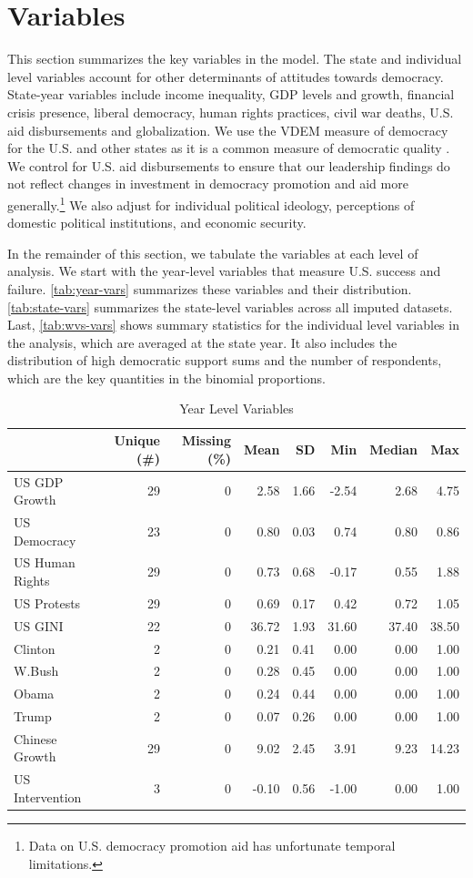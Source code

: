 \documentclass[12pt]{article}
\begin{document}
\section{Variables}


This section summarizes the key variables in the model. 
The state and individual level variables account for other determinants of attitudes towards democracy. 
State-year variables include income inequality, GDP levels and growth, financial crisis presence, liberal democracy, human rights practices, civil war deaths, U.S. aid disbursements and globalization. 
We use the VDEM measure of democracy for the U.S. and other states as it is a common measure of democratic quality \citep{WaldnerLust2018}.
We control for U.S. aid disbursements to ensure that our leadership findings do not reflect changes in investment in democracy promotion and aid more generally.\footnote{Data on U.S. democracy promotion aid has unfortunate temporal limitations.} 
We also adjust for individual political ideology, perceptions of domestic political institutions, and economic security.


In the remainder of this section, we tabulate the variables at each level of analysis. 
We start with the year-level variables that measure U.S. success and failure. 
\autoref{tab:year-vars} summarizes these variables and their distribution. 
\autoref{tab:state-vars} summarizes the state-level variables across all imputed datasets.
Last, \autoref{tab:wvs-vars} shows summary statistics for the individual level variables in the analysis, which are averaged at the state year. 
It also includes the distribution of high democratic support sums and the number of respondents, which are the key quantities in the binomial proportions.
 
 
\begin{table}
\caption{\label{tab:year-vars}Year Level Variables}
\centering
\begin{tabular}[t]{lrrrrrrr}
\toprule
  & Unique (\#) & Missing (\%) & Mean & SD & Min & Median & Max\\
\midrule
US GDP Growth & 29 & 0 & 2.58 & 1.66 & -2.54 & 2.68 & 4.75\\
US Democracy & 23 & 0 & 0.80 & 0.03 & 0.74 & 0.80 & 0.86\\
US Human Rights & 29 & 0 & 0.73 & 0.68 & -0.17 & 0.55 & 1.88\\
US Protests & 29 & 0 & 0.69 & 0.17 & 0.42 & 0.72 & 1.05\\
US GINI & 22 & 0 & 36.72 & 1.93 & 31.60 & 37.40 & 38.50\\
Clinton & 2 & 0 & 0.21 & 0.41 & 0.00 & 0.00 & 1.00\\
W.Bush & 2 & 0 & 0.28 & 0.45 & 0.00 & 0.00 & 1.00\\
Obama & 2 & 0 & 0.24 & 0.44 & 0.00 & 0.00 & 1.00\\
Trump & 2 & 0 & 0.07 & 0.26 & 0.00 & 0.00 & 1.00\\
Chinese Growth & 29 & 0 & 9.02 & 2.45 & 3.91 & 9.23 & 14.23\\
US Intervention & 3 & 0 & -0.10 & 0.56 & -1.00 & 0.00 & 1.00\\
\bottomrule
\end{tabular}
\end{table}
\end{document}
